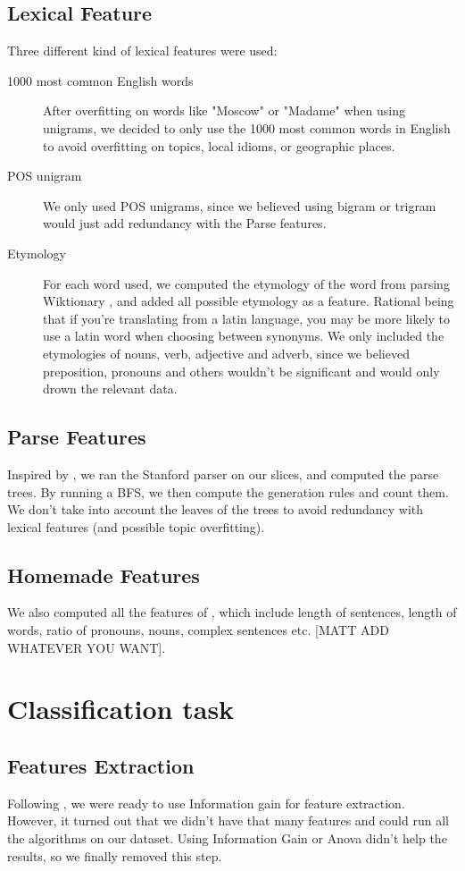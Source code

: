 \documentclass[10pt]{article}
\begin{document}
\subsection{Lexical Feature}
Three different kind of lexical features were used:
\begin{description}
\item[1000 most common English words] After overfitting on words like "Moscow" or "Madame" when using unigrams, we decided to only use the 1000 most common words in English to avoid overfitting on topics, local idioms, or geographic places.
\item[POS unigram] We only used POS unigrams, since we believed using bigram or trigram would just add redundancy with the Parse features.
\item[Etymology] For each word used, we computed the etymology of the word from parsing Wiktionary \cite{Wiktionary}, and added all possible etymology as a feature. Rational being that if you're translating from a latin language, you may be more likely to use a latin word when choosing between synonyms. We only included the etymologies of nouns, verb, adjective and adverb, since we believed preposition, pronouns  and others wouldn't be significant and would only drown the relevant data.
\end{description}

\subsection{Parse Features}
Inspired by \cite{Parse}, we ran the Stanford parser on our slices, and computed the parse trees. By running a BFS, we then compute the generation rules and count them. We don't take into account the leaves of the trees to avoid redundancy with lexical features (and possible topic overfitting).


\subsection{Homemade Features}
We also computed all the features of \cite{homemade}, which include length of sentences, length of words, ratio of pronouns, nouns, complex sentences etc. [MATT ADD WHATEVER YOU WANT].




\section{Classification task}
\subsection{Features Extraction}
Following \cite{Parse}, we were ready to use Information gain for feature extraction. However, it turned out that we didn't have that many features and could run all the algorithms on our dataset. Using Information Gain or Anova didn't help the results, so we finally removed this step.
\end{document}
